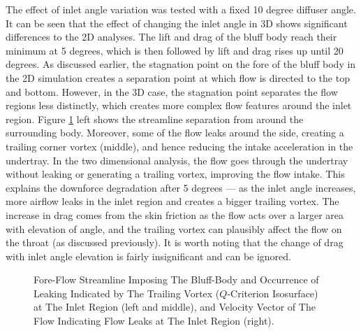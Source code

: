 \noindent The effect of inlet angle variation was tested with a fixed 10 degree diffuser angle. It can be seen that the effect of changing the inlet angle in 3D shows significant differences to the 2D analyses. The lift and drag of the bluff body reach their minimum at 5 degrees, which is then followed by lift and drag rises up until 20 degrees. As discussed earlier, the stagnation point on the fore of the bluff body in the 2D simulation creates a separation point at which flow is directed to the top and bottom. However, in the 3D case, the stagnation point separates the flow regions less distinctly, which creates more complex flow features around the inlet region. Figure \ref{fig:3D_OF_INLET_COMPARE} left shows the streamline separation from around the surrounding body. Moreover, some of the flow leaks around the side, creating a trailing corner vortex (middle), and hence reducing the intake acceleration in the undertray. In the two dimensional analysis, the flow goes through the undertray without leaking or generating a trailing vortex, improving the flow intake. This explains the downforce degradation after 5 degrees --- as the inlet angle increases, more airflow leaks in the inlet region and creates a bigger trailing vortex. The increase in drag comes from the skin friction as the flow acts over a larger area with elevation of angle, and the trailing vortex can plausibly affect the flow on the throat (as discussed previously). It is worth noting that the change of drag with inlet angle elevation is fairly insignificant and can be ignored.

\begin{figure}[!htb]
    \centering
    \noindent{}
    \caption{Fore-Flow Streamline Imposing The Bluff-Body and Occurrence of Leaking Indicated by The Trailing Vortex ($Q$-Criterion Isosurface) at The Inlet Region (left and middle), and Velocity Vector of The Flow Indicating Flow Leaks at The Inlet Region (right).} 
    \label{fig:3D_OF_INLET_COMPARE}
\end{figure}

